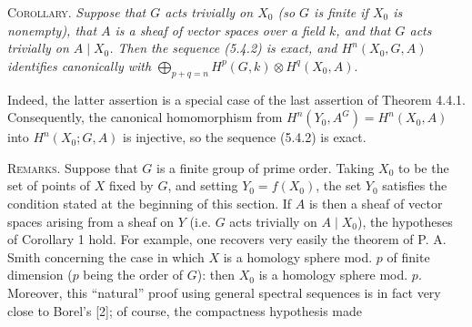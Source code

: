 \textsc{Corollary.} \textit{Suppose that $G$ acts trivially on $X_0$
(so $G$ is finite if $X_0$ is nonempty), that $A$ is a sheaf of vector spaces over a field $k$,
and that $G$ acts trivially on $A\mathbin{|}X_0$. Then the sequence \textup{(5.4.2)} is
exact, and $H^n(X_0,G,A)$ identifies canonically with}
$\displaystyle\bigoplus_{p+q=n}H^p(G,k)\otimes H^q(X_0,A)$.

Indeed, the latter assertion is a special case of the last assertion of
Theorem 4.4.1. Consequently, the canonical homomorphism from
$H^n(Y_0,A^G)=H^n(X_0,A)$ into $H^n(X_0;G,A)$ is injective, so the sequence
(5.4.2) is exact.

\textsc{Remarks.} Suppose that $G$ is a finite group of prime order.
Taking $X_0$ to be the set of points of $X$ fixed by $G$, and setting
$Y_0=f(X_0)$, the set $Y_0$ satisfies the condition stated at the beginning of
this section. If $A$ is then a sheaf of vector spaces arising from a sheaf on
$Y$ (i.e. $G$ acts trivially on $A\mathbin{|}X_0$), the hypotheses of
Corollary 1 hold. For example, one recovers very easily the theorem of P. A.
Smith concerning the case in which $X$ is a homology sphere mod. $p$ of
finite dimension ($p$ being the order of $G$): then $X_0$ is a homology sphere
mod. $p$. Moreover, this ``natural'' proof using general spectral sequences is
in fact very close to Borel's [2]; of course, the compactness hypothesis made

